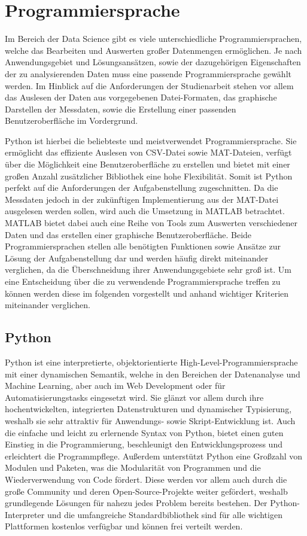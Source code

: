 \section{Programmiersprache}

Im Bereich der Data Science gibt es viele unterschiedliche Programmiersprachen, welche das Bearbeiten und Auswerten großer Datenmengen ermöglichen. Je nach Anwendungsgebiet und Lösungsansätzen, sowie der dazugehörigen Eigenschaften der zu analysierenden Daten muss eine passende Programmiersprache gewählt werden. Im Hinblick auf die Anforderungen der Studienarbeit stehen vor allem das Auslesen der Daten aus vorgegebenen Datei-Formaten, das graphische Darstellen der Messdaten, sowie die Erstellung einer passenden Benutzeroberfläche im Vordergrund.\cite{dataSciLang}

Python ist hierbei die beliebteste und meistverwendet Programmiersprache.\cite{dataSciLang} Sie ermöglicht das effiziente Auslesen von CSV-Datei sowie MAT-Dateien, verfügt über die Möglichkeit eine Benutzeroberfläche zu erstellen und bietet mit einer großen Anzahl zusätzlicher Bibliothek eine hohe Flexibilität. Somit ist Python perfekt auf die Anforderungen der Aufgabenstellung zugeschnitten. Da die Messdaten jedoch in der zukünftigen Implementierung aus der MAT-Datei ausgelesen werden sollen, wird auch die Umsetzung in MATLAB betrachtet. MATLAB bietet dabei auch eine Reihe von Tools zum Auswerten verschiedener Daten und das erstellen einer graphische Benutzeroberfläche. Beide Programmiersprachen stellen alle benötigten Funktionen sowie Ansätze zur Lösung der Aufgabenstellung dar und werden häufig direkt miteinander verglichen, da die Überschneidung ihrer Anwendungsgebiete sehr groß ist. Um eine Entscheidung über die zu verwendende Programmiersprache treffen zu können werden diese im folgenden vorgestellt und anhand wichtiger Kriterien miteinander verglichen.

\subsection{Python}

Python ist eine interpretierte, objektorientierte High-Level-Programmiersprache mit einer dynamischen Semantik, welche in den Bereichen der Datenanalyse und Machine Learning, aber auch im Web Development oder für Automatisierungstasks eingesetzt wird. Sie glänzt vor allem durch ihre hochentwickelten, integrierten Datenstrukturen und dynamischer Typisierung, weshalb sie sehr attraktiv für Anwendungs- sowie Skript-Entwicklung ist. Auch die einfache und leicht zu erlernende Syntax von Python, bietet einen guten Einstieg in die Programmierung, beschleunigt den Entwicklungsprozess und erleichtert die Programmpflege. Außerdem unterstützt Python eine Großzahl von Modulen und Paketen, was die Modularität von Programmen und die Wiederverwendung von Code fördert. Diese werden vor allem auch durch die große Community und deren Open-Source-Projekte weiter gefördert, weshalb grundlegende Lösungen für nahezu jedes Problem bereits bestehen. Der Python-Interpreter und die umfangreiche Standardbibliothek sind für alle wichtigen Plattformen kostenlos verfügbar und können frei verteilt werden.\cite{whatIsPython}\cite{pythonBeginners}

